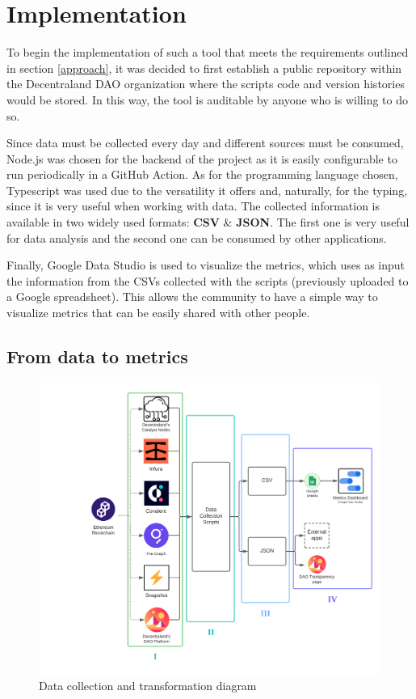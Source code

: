 \documentclass[MSE,Master,english]{twbook}%
\begin{document}
\section{Implementation}
To begin the implementation of such a tool that meets the requirements outlined in section \ref{approach}, it was decided to first establish a public repository\cite{transparencyRepo} within the Decentraland DAO organization where the scripts code and version histories would be stored. In this way, the tool is auditable by anyone who is willing to do so.

Since data must be collected every day and different sources must be consumed, Node.js was chosen for the backend of the project as it is easily configurable to run periodically in a GitHub Action\cite{ghAction}. As for the programming language chosen, Typescript was used due to the versatility it offers and, naturally, for the typing, since it is very useful when working with data. The collected information is available in two widely used formats: \textbf{CSV} \& \textbf{JSON}. The first one is very useful for data analysis and the second one can be consumed by other applications.

Finally, Google Data Studio\cite{transparencyDashboard} is used to visualize the metrics, which uses as input the information from the CSVs collected with the scripts (previously uploaded to a Google spreadsheet). This allows the community to have a simple way to visualize metrics that can be easily shared with other people.

\subsection{From data to metrics}
\begin{figure}[H]
  \centering
  \includegraphics[width=\textwidth]{diagram.png}
  \caption{Data collection and transformation diagram}
  \label{fig:diagram}
\end{figure}
\end{document}
